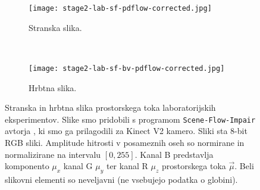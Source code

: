 \begin{figure}[!htb]
	\centering
	\begin{subfigure}[t]{0.45\columnwidth}
		\centering
		\texttt{[image: stage2-lab-sf-pdflow-corrected.jpg]}
		\caption{Stranska slika.}
	\end{subfigure}
	~
	\begin{subfigure}[t]{0.45\columnwidth}
		\centering
		\texttt{[image: stage2-lab-sf-bv-pdflow-corrected.jpg]}
		\caption{Hrbtna slika.}
	\end{subfigure}
	\caption[Stranska in hrbtna slika prostorskega toka laboratorijskih eksperimentov]{Stranska in hrbtna slika prostorskega toka laboratorijskih eksperimentov. Slike smo pridobili s programom \texttt{Scene-Flow-Impair} avtorja \cite{jaimez2015primal}, ki smo ga prilagodili za Kinect V2 kamero. Sliki sta 8-bit RGB sliki. Amplitude hitrosti v posameznih oseh so normirane in normalizirane na intervalu $[0,255]$. Kanal B predstavlja komponento $\mu_x$ kanal G $\mu_y$ ter kanal R $\mu_z$ prostorskega toka $\vec{\mu}$. Beli slikovni elementi so neveljavni (ne vsebujejo podatka o globini).}
	\label{fig:stage2-lab-sf-pd}
\end{figure}

